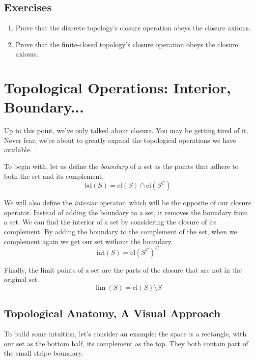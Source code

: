 \documentclass{report}
\newcommand{\cl}{\mathrm{cl}}
\newcommand{\intr}{\mathrm{int}}
\newcommand{\bd}{\mathrm{bd}}
\begin{document}
\subsection*{Exercises}

\begin{enumerate}

\item Prove that the discrete topology's closure operation obeys the closure axioms.
\item Prove that the finite-closed topology's closure operation obeys the closure axioms.
\end{enumerate}

\section{Topological Operations: Interior, Boundary...}

Up to this point, we've only talked about closure. You may be getting tired of it. Never fear, we're about to greatly expand the topological operations we have available.

To begin with, let us define the \emph{boundary} of a set as the points that adhere to both the set and its complement. $$\bd(S) = \cl(S)∩\cl(S^C)$$

We will also define the \emph{interior} operator, which will be the opposite of our closure operator. Instead of adding the boundary to a set, it removes the boundary from a set. We can find the interior of a set by considering the closure of its complement. By adding the boundary to the complement of the set, when we complement again we get our set without the boundary. $$\intr(S) = \cl(S^C)^C$$

Finally, the limit points of a set are the parts of the closure that are not in the original set. $$\lim(S) = \cl(S) \setminus S$$

\subsection*{Topological Anatomy, A Visual Approach}

To build some intuition, let's consider an example: the space is a rectangle, with our set as the bottom half, its complement as the top. They both contain part of the small stripe boundary.
\end{document}
